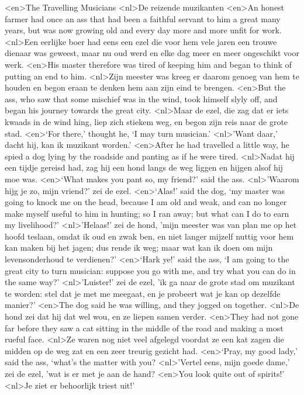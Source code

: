<en>The Travelling Musicians
<nl>De reizende muzikanten
<en>An honest farmer had once an ass that had been a faithful servant to him a great many years, but was now growing old and every day more and more unfit for work.
<nl>Een eerlijke boer had eens een ezel die voor hem vele jaren een trouwe dienaar was geweest, maar nu  oud werd en elke dag meer en meer ongeschikt voor werk.
<en>His master therefore was tired of keeping him and began to think of putting an end to him.
<nl>Zijn meester was kreeg er daarom genoeg van hem te houden en begon eraan te denken  hem aan zijn eind te brengen.
<en>But the ass, who saw that some mischief was in the wind, took himself slyly off, and began his journey towards the great city.
<nl>Maar de ezel, die zag dat er iets kwaads in de wind hing, liep zich stiekem  weg, en begon zijn reis naar de grote stad.
<en>‘For there,’ thought he, ‘I may turn musician.’
<nl>'Want daar,' dacht hij, kan ik muzikant worden.'
<en>After he had travelled a little way, he spied a dog lying by the roadside and panting as if he were tired.
<nl>Nadat hij een tijdje gereisd had, zag hij een hond langs de weg liggen en hijgen alsof hij moe was.
<en>‘What makes you pant so, my friend?’ said the ass.
<nl>'Waarom hijg je zo, mijn vriend?' zei de ezel.
<en>‘Alas!’ said the dog, ‘my master was going to knock me on the head, because I am old and weak, and can no longer make myself useful to him in hunting; so I ran away; but what can I do to earn my livelihood?’
<nl>'Helaas!' zei de hond, 'mijn meester was van plan me op het hoofd teslaan, omdat ik oud en zwak ben, en niet langer mijzelf nuttig voor hem kan maken  bij het jagen; dus rende ik weg; maar wat kan ik doen om mijn levensonderhoud te verdienen?'
<en>‘Hark ye!’ said the ass, ‘I am going to the great city to turn musician: suppose you go with me, and try what you can do in the same way?’
<nl>'Luister!' zei de ezel, 'ik ga naar de grote stad om muzikant te worden: stel dat je met me meegaat, en je probeert wat je kan op dezelfde manier?'
<en>The dog said he was willing, and they jogged on together.
<nl>De hond zei dat hij dat wel wou, en ze liepen samen verder.
<en>They had not gone far before they saw a cat sitting in the middle of the road and making a most rueful face.
<nl>Ze waren nog niet veel afgelegd voordat ze een kat zagen die midden op de weg zat en een zeer treurig gezicht had.
<en>‘Pray, my good lady,’ said the ass, ‘what’s the matter with you?
<nl>'Vertel eens, mijn goede dame,' zei de ezel, 'wat is er met je aan de hand?
<en>You look quite out of spirits!’
<nl>Je ziet er behoorlijk triest uit!'
